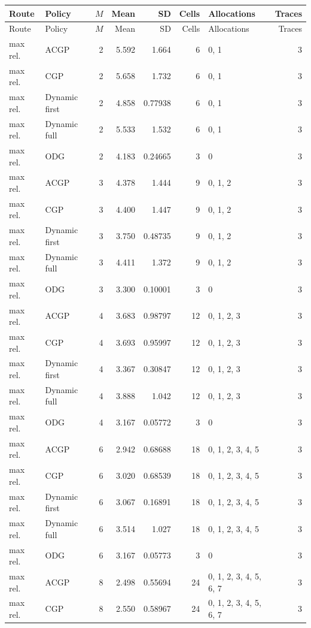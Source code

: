 \documentclass[10pt,a4paper]{article}
\begin{document}
\tiny\setlength{\tabcolsep}{2pt}\begin{longtable}{@{}p{23mm}p{29mm}rrrrp{36mm}r@{}}
\toprule Route & Policy & $M$ & Mean & SD & Cells & Allocations & Traces \\ \midrule\endfirsthead
\toprule Route & Policy & $M$ & Mean & SD & Cells & Allocations & Traces \\ \midrule\endhead
\bottomrule\endfoot
max rel. & ACGP & 2 & 5.592 & 1.664 & 6 & 0, 1 & 3 \\
max rel. & CGP & 2 & 5.658 & 1.732 & 6 & 0, 1 & 3 \\
max rel. & Dynamic first & 2 & 4.858 & 0.77938 & 6 & 0, 1 & 3 \\
max rel. & Dynamic full & 2 & 5.533 & 1.532 & 6 & 0, 1 & 3 \\
max rel. & ODG & 2 & 4.183 & 0.24665 & 3 & 0 & 3 \\
max rel. & ACGP & 3 & 4.378 & 1.444 & 9 & 0, 1, 2 & 3 \\
max rel. & CGP & 3 & 4.400 & 1.447 & 9 & 0, 1, 2 & 3 \\
max rel. & Dynamic first & 3 & 3.750 & 0.48735 & 9 & 0, 1, 2 & 3 \\
max rel. & Dynamic full & 3 & 4.411 & 1.372 & 9 & 0, 1, 2 & 3 \\
max rel. & ODG & 3 & 3.300 & 0.10001 & 3 & 0 & 3 \\
max rel. & ACGP & 4 & 3.683 & 0.98797 & 12 & 0, 1, 2, 3 & 3 \\
max rel. & CGP & 4 & 3.693 & 0.95997 & 12 & 0, 1, 2, 3 & 3 \\
max rel. & Dynamic first & 4 & 3.367 & 0.30847 & 12 & 0, 1, 2, 3 & 3 \\
max rel. & Dynamic full & 4 & 3.888 & 1.042 & 12 & 0, 1, 2, 3 & 3 \\
max rel. & ODG & 4 & 3.167 & 0.05772 & 3 & 0 & 3 \\
max rel. & ACGP & 6 & 2.942 & 0.68688 & 18 & 0, 1, 2, 3, 4, 5 & 3 \\
max rel. & CGP & 6 & 3.020 & 0.68539 & 18 & 0, 1, 2, 3, 4, 5 & 3 \\
max rel. & Dynamic first & 6 & 3.067 & 0.16891 & 18 & 0, 1, 2, 3, 4, 5 & 3 \\
max rel. & Dynamic full & 6 & 3.514 & 1.027 & 18 & 0, 1, 2, 3, 4, 5 & 3 \\
max rel. & ODG & 6 & 3.167 & 0.05773 & 3 & 0 & 3 \\
max rel. & ACGP & 8 & 2.498 & 0.55694 & 24 & 0, 1, 2, 3, 4, 5, 6, 7 & 3 \\
max rel. & CGP & 8 & 2.550 & 0.58967 & 24 & 0, 1, 2, 3, 4, 5, 6, 7 & 3 \\

\end{longtable}
\end{document}
